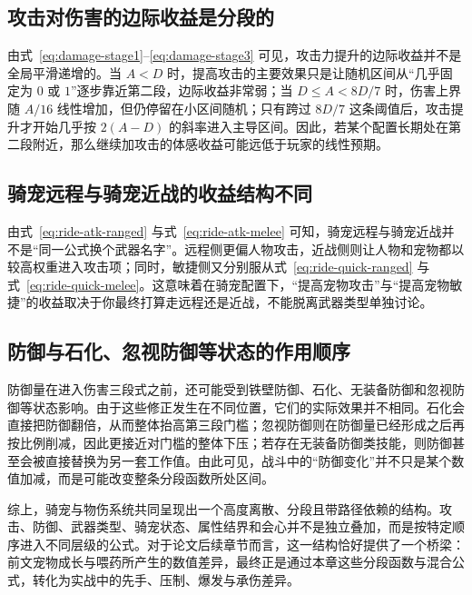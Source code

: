 \subsection{攻击对伤害的边际收益是分段的}

由式~\eqref{eq:damage-stage1}--\eqref{eq:damage-stage3} 可见，攻击力提升的边际收益并不是全局平滑递增的。当 $A<D$ 时，提高攻击的主要效果只是让随机区间从“几乎固定为 $0$ 或 $1$”逐步靠近第二段，边际收益非常弱；当 $D\le A < 8D/7$ 时，伤害上界随 $A/16$ 线性增加，但仍停留在小区间随机；只有跨过 $8D/7$ 这条阈值后，攻击提升才开始几乎按 $2(A-D)$ 的斜率进入主导区间。因此，若某个配置长期处在第二段附近，那么继续加攻击的体感收益可能远低于玩家的线性预期。

\subsection{骑宠远程与骑宠近战的收益结构不同}

由式~\eqref{eq:ride-atk-ranged} 与式~\eqref{eq:ride-atk-melee} 可知，骑宠远程与骑宠近战并不是“同一公式换个武器名字”。远程侧更偏人物攻击，近战侧则让人物和宠物都以较高权重进入攻击项；同时，敏捷侧又分别服从式~\eqref{eq:ride-quick-ranged} 与式~\eqref{eq:ride-quick-melee}。这意味着在骑宠配置下，“提高宠物攻击”与“提高宠物敏捷”的收益取决于你最终打算走远程还是近战，不能脱离武器类型单独讨论。

\subsection{防御与石化、忽视防御等状态的作用顺序}

防御量在进入伤害三段式之前，还可能受到铁壁防御、石化、无装备防御和忽视防御等状态影响。由于这些修正发生在不同位置，它们的实际效果并不相同。石化会直接把防御翻倍，从而整体抬高第三段门槛；忽视防御则在防御量已经形成之后再按比例削减，因此更接近对门槛的整体下压；若存在无装备防御类技能，则防御甚至会被直接替换为另一套工作值。由此可见，战斗中的“防御变化”并不只是某个数值加减，而是可能改变整条分段函数所处区间。

综上，骑宠与物伤系统共同呈现出一个高度离散、分段且带路径依赖的结构。攻击、防御、武器类型、骑宠状态、属性结界和会心并不是独立叠加，而是按特定顺序进入不同层级的公式。对于论文后续章节而言，这一结构恰好提供了一个桥梁：前文宠物成长与喂药所产生的数值差异，最终正是通过本章这些分段函数与混合公式，转化为实战中的先手、压制、爆发与承伤差异。

